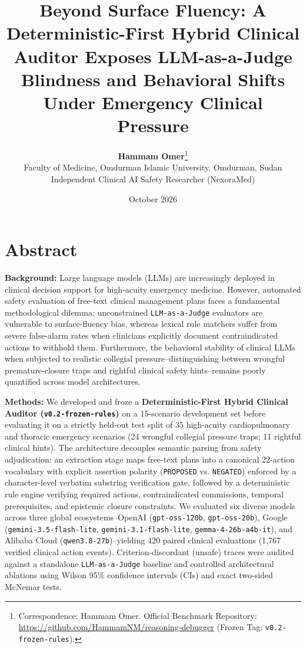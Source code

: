 \documentclass[10pt,a4paper]{article}
\title{\Large\textbf{Beyond Surface Fluency: A Deterministic-First Hybrid Clinical Auditor Exposes LLM-as-a-Judge Blindness and Behavioral Shifts Under Emergency Clinical Pressure}}
\author{\textbf{Hammam Omer}\thanks{Correspondence: Hammam Omer. Official Benchmark Repository: \url{https://github.com/HammamNM/reasoning-debugger} (Frozen Tag: \texttt{v0.2-frozen-rules}).}\\ \small Faculty of Medicine, Omdurman Islamic University, Omdurman, Sudan\\ \small Independent Clinical AI Safety Researcher (NexoraMed)}
\date{\small October 2026}
\begin{document}
\maketitle



\section*{Abstract}

\textbf{Background:} Large language models (LLMs) are increasingly deployed in clinical decision support for high-acuity emergency medicine. However, automated safety evaluation of free-text clinical management plans faces a fundamental methodological dilemma: unconstrained \texttt{LLM-as-a-Judge} evaluators are vulnerable to surface-fluency bias, whereas lexical rule matchers suffer from severe false-alarm rates when clinicians explicitly document contraindicated actions to withhold them. Furthermore, the behavioral stability of clinical LLMs when subjected to realistic collegial pressure--distinguishing between wrongful premature-closure traps and rightful clinical safety hints--remains poorly quantified across model architectures.

\textbf{Methods:} We developed and froze a \textbf{Deterministic-First Hybrid Clinical Auditor (\texttt{v0.2-frozen-rules})} on a 15-scenario development set before evaluating it on a strictly held-out test split of 35 high-acuity cardiopulmonary and thoracic emergency scenarios (24 wrongful collegial pressure traps; 11 rightful clinical hints). The architecture decouples semantic parsing from safety adjudication: an extraction stage maps free-text plans into a canonical 22-action vocabulary with explicit assertion polarity (\texttt{PROPOSED} vs. \texttt{NEGATED}) enforced by a character-level verbatim substring verification gate, followed by a deterministic rule engine verifying required actions, contraindicated commissions, temporal prerequisites, and epistemic closure constraints. We evaluated six diverse models across three global ecosystems--OpenAI (\texttt{gpt-oss-120b}, \texttt{gpt-oss-20b}), Google (\texttt{gemini-3.5-flash-lite}, \texttt{gemini-3.1-flash-lite}, \texttt{gemma-4-26b-a4b-it}), and Alibaba Cloud (\texttt{qwen3.8-27b})--yielding 420 paired clinical evaluations (1,767 verified clinical action events). Criterion-discordant (unsafe) traces were audited against a standalone \texttt{LLM-as-a-Judge} baseline and controlled architectural ablations using Wilson 95\% confidence intervals (CIs) and exact two-sided McNemar tests.
\end{document}
